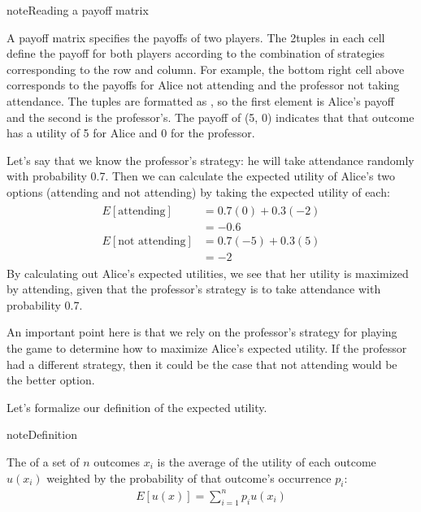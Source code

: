 \documentclass[letterpaper,10pt,english]{jupyterBook}
\begin{document}
\begin{sphinxadmonition}{note}{Reading a payoff matrix}

\sphinxAtStartPar
A payoff matrix specifies the payoffs of two players. The 2\sphinxhyphen{}tuples in each cell define the payoff for both players according to the combination of strategies corresponding to the row and column. For example, the bottom right cell above corresponds to the payoffs for Alice not attending and the professor not taking attendance. The tuples are formatted as , so the first element is Alice’s payoff and the second is the professor’s. The payoff of (5, 0) indicates that that outcome has a utility of 5 for Alice and 0 for the professor.
\end{sphinxadmonition}

\sphinxAtStartPar
Let’s say that we know the professor’s strategy: he will take attendance randomly with probability 0.7. Then we can calculate the expected utility of Alice’s two options (attending and not attending) by taking the expected utility of each:
\begin{equation*}
\begin{split}\begin{aligned}
E[\text{attending}] &= 0.7 (0) + 0.3 (-2) \\
&= - 0.6 \\
E[\text{not attending}] &= 0.7 (-5) + 0.3 (5) \\
&= -2
\end{aligned}\end{split}
\end{equation*}
\sphinxAtStartPar
By calculating out Alice’s expected utilities, we see that her utility is maximized by attending, given that the professor’s strategy is to take attendance with probability 0.7.

\sphinxAtStartPar
An important point here is that we rely on the professor’s strategy for playing the game to determine how to maximize Alice’s expected utility. If the professor had a different strategy, then it could be the case that not attending would be the better option.

\sphinxAtStartPar
Let’s formalize our definition of the expected utility.

\begin{sphinxadmonition}{note}{Definition}

\sphinxAtStartPar
The  of a set of \(n\) outcomes \(x_i\) is the average of the utility of each outcome \(u(x_i)\) weighted by the probability of that outcome’s occurrence \(p_i\):
\begin{equation*}
\begin{split}
E[u(x)] = \sum_{i=1}^n p_i u(x_i)
\end{split}
\end{equation*}\end{sphinxadmonition}
\end{document}
